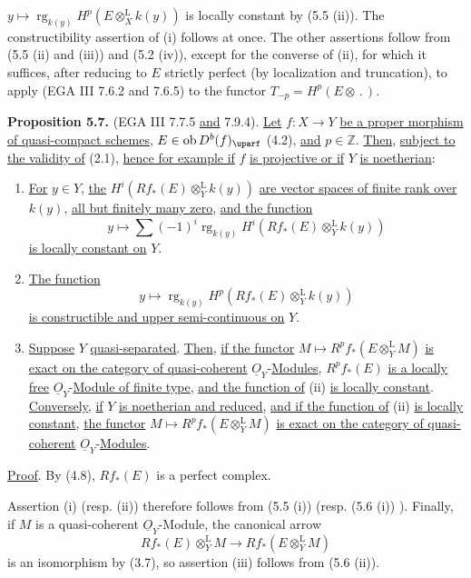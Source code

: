 %
\(y\mapsto\operatorname{rg}_{k(y)}H^p(E\otimes_X^{\mathrm L}k(y))\) is locally constant by (5.5 (ii)). The constructibility assertion of (i) follows at once. The other assertions follow from (5.5 (ii) and (iii)) and (5.2 (iv)), except for the converse of (ii), for which it suffices, after reducing to \(E\) strictly perfect (by localization and truncation), to apply (EGA III 7.6.2 and 7.6.5) to the functor \(T_{-p}=H^p(E\otimes\,.\,)\).

\textbf{Proposition 5.7.} (EGA III 7.7.5 \uline{and} 7.9.4). \uline{Let} \(f:X\to Y\) \uline{be a proper morphism of quasi-compact schemes}, \(E\in\Ob D^b(f)_{\uparf}\) (4.2), \uline{and} \(p\in\mathbb Z\). \uline{Then}, \uline{subject to the validity of} (2.1), \uline{hence for example if} \(f\) \uline{is projective or if} \(Y\) \uline{is noetherian}:
\begin{enumerate}[label=(\roman*)]
\item \uline{For} \(y\in Y\), \uline{the} \(H^i(Rf_*(E)\otimes_Y^{\mathrm L}k(y))\) \uline{are vector spaces of finite rank over} \(k(y)\), \uline{all but finitely many zero}, \uline{and the function}
\[
 y\longmapsto\sum(-1)^i\operatorname{rg}_{k(y)}H^i(Rf_*(E)\otimes_Y^{\mathrm L}k(y))
\]
\uline{is locally constant on} \(Y\).
\item \uline{The function}
\[
 y\longmapsto\operatorname{rg}_{k(y)}H^p(Rf_*(E)\otimes_Y^{\mathrm L}k(y))
\]
\uline{is constructible and upper semi-continuous on} \(Y\).
\item \uline{Suppose} \(Y\) \uline{quasi-separated}. \uline{Then}, \uline{if the functor} \(M\mapsto R^pf_*(E\otimes_Y^{\mathrm L}M)\) \uline{is exact on the category of quasi-coherent} \(\underline{O}_Y\)-\uline{Modules}, \(R^pf_*(E)\) \uline{is a locally free} \(\underline{O}_Y\)-\uline{Module of finite type}, \uline{and the function of} (ii) \uline{is locally constant}. \uline{Conversely}, \uline{if} \(Y\) \uline{is noetherian and reduced}, \uline{and if the function of} (ii) \uline{is locally constant}, \uline{the functor} \(M\mapsto R^pf_*(E\otimes_Y^{\mathrm L}M)\) \uline{is exact on the category of quasi-coherent} \(\underline{O}_Y\)-\uline{Modules}.
\end{enumerate}

%
\uline{Proof}. By (4.8), \(Rf_*(E)\) is a perfect complex.

Assertion (i) (resp. (ii)) therefore follows from (5.5 (i)) (resp. (5.6 (i)) ). Finally, if \(M\) is a quasi-coherent \(\underline{O}_Y\)-Module, the canonical arrow
\[
 Rf_*(E)\otimes_Y^{\mathrm L}M\longrightarrow Rf_*(E\otimes_Y^{\mathrm L}M)
\]
is an isomorphism by (3.7), so assertion (iii) follows from (5.6 (ii)).

